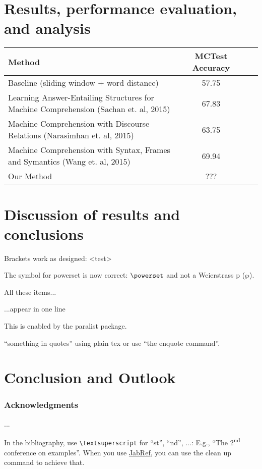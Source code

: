 \documentclass[runningheads,a4paper]{llncs}
\begin{document}
\section{Results, performance evaluation, and analysis}

\begin{tabular}
	{l*{2}{c}r}   	 Method  & MCTest Accuracy  \\ \hline
	Baseline (sliding window + word distance) & 57.75 \\ 
	Learning Answer-Entailing Structures for Machine Comprehension (Sachan et. al, 2015) & 67.83\\
	Machine Comprehension with Discourse Relations (Narasimhan et. al, 2015) & 63.75\\
	Machine Comprehension with Syntax, Frames and Symantics (Wang et. al, 2015) & 69.94\\
	Our Method & ???\\
	
\end{tabular}

\section{Discussion of results and conclusions}






Brackets work as designed:
<test>

The symbol for powerset is now correct: $\powerset$ and not a Weierstrass p ($\wp$).

\begin{inparaenum}
\item All these items...
\item ...appear in one line
\item This is enabled by the paralist package.
\end{inparaenum}

``something in quotes'' using plain tex or use \enquote{the enquote command}.

\section{Conclusion and Outlook}

\subsubsection*{Acknowledgments}
...

In the bibliography, use \texttt{\textbackslash textsuperscript} for ``st'', ``nd'', ...:
E.g., \enquote{The 2\textsuperscript{nd} conference on examples}. \cite{richardson2013mctest}
When you use \href{http://www.jabref.org}{JabRef}, you can use the clean up command to achieve that.
\end{document}
